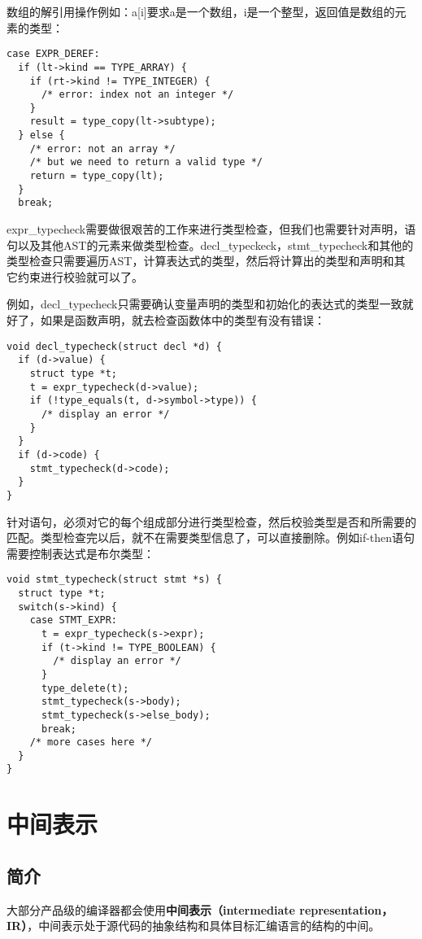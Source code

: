 \documentclass[cn,11pt,chinese]{elegantbook}
\begin{document}
数组的解引用操作例如：a[i]要求a是一个数组，i是一个整型，返回值是数组的元素的类型：

\begin{verbatim}
case EXPR_DEREF:
  if (lt->kind == TYPE_ARRAY) {
    if (rt->kind != TYPE_INTEGER) {
      /* error: index not an integer */
    }
    result = type_copy(lt->subtype);
  } else {
    /* error: not an array */
    /* but we need to return a valid type */
    return = type_copy(lt);
  }
  break;
\end{verbatim}

expr\_typecheck需要做很艰苦的工作来进行类型检查，但我们也需要针对声明，语句以及其他AST的元素来做类型检查。decl\_typeckeck，stmt\_typecheck和其他的类型检查只需要遍历AST，计算表达式的类型，然后将计算出的类型和声明和其它约束进行校验就可以了。

例如，decl\_typecheck只需要确认变量声明的类型和初始化的表达式的类型一致就好了，如果是函数声明，就去检查函数体中的类型有没有错误：

\begin{verbatim}
void decl_typecheck(struct decl *d) {
  if (d->value) {
    struct type *t;
    t = expr_typecheck(d->value);
    if (!type_equals(t, d->symbol->type)) {
      /* display an error */
    }
  }
  if (d->code) {
    stmt_typecheck(d->code);
  }
}
\end{verbatim}

针对语句，必须对它的每个组成部分进行类型检查，然后校验类型是否和所需要的匹配。类型检查完以后，就不在需要类型信息了，可以直接删除。例如if-then语句需要控制表达式是布尔类型：

\begin{verbatim}
void stmt_typecheck(struct stmt *s) {
  struct type *t;
  switch(s->kind) {
    case STMT_EXPR:
      t = expr_typecheck(s->expr);
      if (t->kind != TYPE_BOOLEAN) {
        /* display an error */
      }
      type_delete(t);
      stmt_typecheck(s->body);
      stmt_typecheck(s->else_body);
      break;
    /* more cases here */
  }
}
\end{verbatim}

\chapter{中间表示}

\section{简介}

大部分产品级的编译器都会使用\textbf{中间表示（intermediate representation，IR）}，中间表示处于源代码的抽象结构和具体目标汇编语言的结构的中间。
\end{document}
